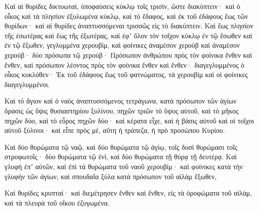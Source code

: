 {Καὶ αἱ θυρίδες δικτυωταὶ, ὑποφαύσεις κύκλῳ τοῖς τρισὶν, ὥστε διακύπτειν· καὶ ὁ οἶκος καὶ τὰ πλησίον ἐξυλωμένα κύκλῳ, καὶ τὸ ἔδαφος, καὶ ἐκ τοῦ ἐδάφους ἕως τῶν θυρίδων· καὶ αἱ θυρίδες ἀναπτυσσόμεναι τρισσῶς εἰς τὸ διακύπτειν.
Καὶ ἕως πλησίον τῆς ἐσωτέρας καὶ ἕως τῆς ἐξωτέρας, καὶ ἐφʼ ὅλον τὸν τοῖχον κύκλῳ ἐν τῷ ἔσωθεν καὶ ἐν τῷ ἔξωθεν,
γεγλυμμένα χερουβὶμ, καὶ φοίνικες ἀναμέσον χεροὺβ καὶ ἀναμέσον χερούβ· δύο πρόσωπα τῷ χερούβ·
Πρόσωπον ἀνθρώπου πρὸς τὸν φοίνικα ἔνθεν καὶ ἔνθεν, καὶ πρόσωπον λέοντος πρὸς τὸν φοίνικα ἔνθεν καὶ ἔνθεν· διαγεγλυμμένος ὁ οἶκος κυκλόθεν·
Ἐκ τοῦ ἐδάφους ἕως τοῦ φατνώματος, τὰ χερουβὶμ καὶ οἱ φοίνικες διαγεγλυμμένοι.
\par }{\PP {}Καὶ τὸ ἅγιον καὶ ὁ ναὸς ἀναπτυσσόμενος τετράγωνα, κατὰ πρόσωπον τῶν ἁγίων ὅρασις ὡς ὄψις
θυσιαστηρίου ξυλίνου, πηχῶν τριῶν τὸ ὕψος αὐτοῦ, καὶ τὸ μῆκος πηχῶν δύο, καὶ τὸ εὖρος πηχῶν δύο· καὶ κέρατα εἶχε, καὶ ἡ βάσις αὐτοῦ καὶ οἱ τοῖχοι αὐτοῦ ξύλινοι· καὶ εἶπε πρὸς μὲ, αὕτη ἡ τράπεζα, ἡ πρὸ προσώπου Κυρίου.
\par }{\PP {}Καὶ δύο θυρώματα τῷ ναῷ, καὶ δύο θυρώματα τῷ ἁγίῳ,
τοῖς δυσὶ θυρώμασι τοῖς στροφωτοῖς· δύο θυρώματα τῷ ἑνὶ, καὶ δύο θυρώματα τῇ θύρᾳ τῇ δευτέρᾳ.
Καὶ γλυφὴ ἐπʼ αὐτῶν, καὶ ἐπὶ τὰ θυρώματα τοῦ ναοῦ χερουβίμ· καὶ φοίνικες κατὰ τὴν γλυφὴν τῶν ἁγίων, καὶ σπουδαῖα ξύλα κατὰ πρόσωπον τοῦ αἰλὰμ ἔξωθεν,
\par }{\PP {}Καὶ θυρίδες κρυπταί· καὶ διεμέτρησεν ἔνθεν καὶ ἔνθεν, εἰς τὰ ὀροφώματα τοῦ αἰλὰμ, καὶ τὰ πλευρὰ τοῦ οἴκου ἐζυγωμένα.

}
